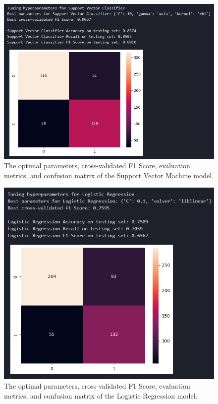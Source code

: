 \documentclass[12pt]{report}
\begin{document}
\begin{figure}[H]
    \centering
    \includegraphics[width=\linewidth]{ModelDev/Iteration2/Results/SVC.png}
    \caption{The optimal parameters, cross-validated F1 Score, evaluation metrics, and confusion matrix of the Support Vector Machine model.}
    \label{fig:SVCIteration2}
\end{figure}

\begin{figure}[H]
    \centering
    \includegraphics[width=\linewidth]{ModelDev/Iteration2/Results/LR.png}
    \caption{The optimal parameters, cross-validated F1 Score, evaluation metrics, and confusion matrix of the Logistic Regression model.}
    \label{fig:LRIteration2}
\end{figure}
\end{document}

